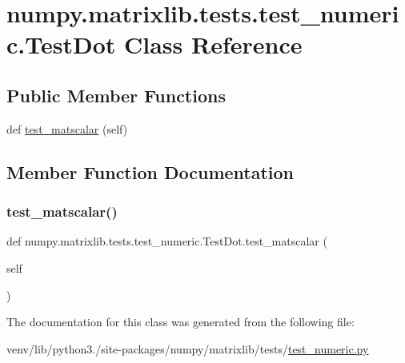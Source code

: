 \hypertarget{classnumpy_1_1matrixlib_1_1tests_1_1test__numeric_1_1TestDot}{}\section{numpy.\+matrixlib.\+tests.\+test\+\_\+numeric.\+Test\+Dot Class Reference}
\label{classnumpy_1_1matrixlib_1_1tests_1_1test__numeric_1_1TestDot}
\subsection*{Public Member Functions}
\begin{DoxyCompactItemize}
\item 
def \hyperlink{classnumpy_1_1matrixlib_1_1tests_1_1test__numeric_1_1TestDot_a414d6e16c688688ad4e0080fe7fa2689}{test\+\_\+matscalar} (self)
\end{DoxyCompactItemize}


\subsection{Member Function Documentation}
\mbox{\label{classnumpy_1_1matrixlib_1_1tests_1_1test__numeric_1_1TestDot_a414d6e16c688688ad4e0080fe7fa2689}} 
\subsubsection{\texorpdfstring{test\+\_\+matscalar()}{test\_matscalar()}}
{\footnotesize\ttfamily def numpy.\+matrixlib.\+tests.\+test\+\_\+numeric.\+Test\+Dot.\+test\+\_\+matscalar (\begin{DoxyParamCaption}\item[{}]{self }\end{DoxyParamCaption})}



The documentation for this class was generated from the following file\+:\begin{DoxyCompactItemize}
\item 
venv/lib/python3./site-\/packages/numpy/matrixlib/tests/\hyperlink{matrixlib_2tests_2test__numeric_8py}{test\+\_\+numeric.\+py}\end{DoxyCompactItemize}
